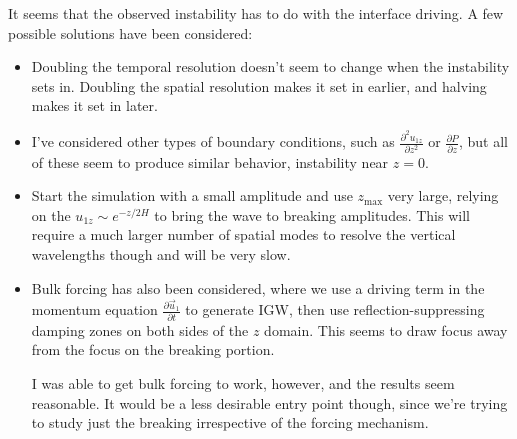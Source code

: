 \documentclass[11pt,
        usenames, %
        dvipsnames %
    ]{article}
\newcommand*{\pd}[2]{\frac{\partial#1}{\partial#2}}
\newcommand*{\ptd}[2]{\frac{\partial^2 #1}{\partial#2^2}}
\begin{document}
It seems that the observed instability has to do with the interface driving. A
few possible solutions have been considered:
\begin{itemize}
    \item Doubling the temporal resolution doesn't seem to change when the
        instability sets in. Doubling the spatial resolution makes it set in
        earlier, and halving makes it set in later.

    \item I've considered other types of boundary conditions, such as
        $\ptd{u_{1z}}{z}$ or $\pd{P}{z}$, but all of these seem to produce
        similar behavior, instability near $z = 0$.

    \item Start the simulation with a small amplitude and use $z_{\max}$ very
        large, relying on the $u_{1z} \sim e^{-z/2H}$ to bring the wave to
        breaking amplitudes. This will require a much larger number of spatial
        modes to resolve the vertical wavelengths though and will be very slow.

    \item Bulk forcing has also been considered, where we use a driving term in
        the momentum equation $\pd{\vec{u}_1}{t}$ to generate IGW, then use
        reflection-suppressing damping zones on both sides of the $z$ domain.
        This seems to draw focus away from the focus on the breaking portion.

        I was able to get bulk forcing to work, however, and the results seem
        reasonable. It would be a less desirable entry point though, since we're
        trying to study just the breaking irrespective of the forcing mechanism.
\end{itemize}
\end{document}
